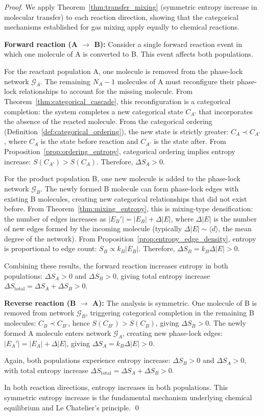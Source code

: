 \documentclass[12pt,a4paper]{article}
\theoremstyle{definition}
\theoremstyle{remark}
\newcommand{\phaselockgraph}{\mathcal{G}}
\begin{document}
\begin{proof}
We apply Theorem~\ref{thm:transfer_mixing} (symmetric entropy increase in molecular transfer) to each reaction direction, showing that the categorical mechanisms established for gas mixing apply equally to chemical reactions.

\textbf{Forward reaction (A $\to$ B):}
Consider a single forward reaction event in which one molecule of A is converted to B. This event affects both populations.

For the reactant population A, one molecule is removed from the phase-lock network $\phaselockgraph_A$. The remaining $N_A - 1$ molecules of A must reconfigure their phase-lock relationships to account for the missing molecule. From Theorem~\ref{thm:categorical_cascade}, this reconfiguration is a categorical completion: the system completes a new categorical state $C_{A'}$ that incorporates the absence of the reacted molecule. From the categorical ordering (Definition~\ref{def:categorical_ordering}), the new state is strictly greater: $C_A \prec C_{A'}$, where $C_A$ is the state before reaction and $C_{A'}$ is the state after. From Proposition~\ref{prop:ordering_entropy}, categorical ordering implies entropy increase: $S(C_{A'}) > S(C_A)$. Therefore, $\Delta S_A > 0$.

For the product population B, one new molecule is added to the phase-lock network $\phaselockgraph_B$. The newly formed B molecule can form phase-lock edges with existing B molecules, creating new categorical relationships that did not exist before. From Theorem~\ref{thm:mixing_entropy}, this is mixing-type densification: the number of edges increases as $|E_B'| = |E_B| + \Delta |E|$, where $\Delta |E|$ is the number of new edges formed by the incoming molecule (typically $\Delta |E| \sim \langle d \rangle$, the mean degree of the network). From Proposition~\ref{prop:entropy_edge_density}, entropy is proportional to edge count: $S_B \propto k_B |E_B|$. Therefore, $\Delta S_B = k_B \Delta |E| > 0$.

Combining these results, the forward reaction increases entropy in both populations: $\Delta S_A > 0$ and $\Delta S_B > 0$, giving total entropy increase $\Delta S_{\text{total}} = \Delta S_A + \Delta S_B > 0$.

\textbf{Reverse reaction (B $\to$ A):}
The analysis is symmetric. One molecule of B is removed from network $\phaselockgraph_B$, triggering categorical completion in the remaining B molecules: $C_B \prec C_{B'}$, hence $S(C_{B'}) > S(C_B)$, giving $\Delta S_B > 0$. The newly formed A molecule enters network $\phaselockgraph_A$, creating new phase-lock edges: $|E_A'| = |E_A| + \Delta |E|$, giving $\Delta S_A = k_B \Delta |E| > 0$.

Again, both populations experience entropy increase: $\Delta S_B > 0$ and $\Delta S_A > 0$, with total entropy increase $\Delta S_{\text{total}} = \Delta S_A + \Delta S_B > 0$.

In both reaction directions, entropy increases in both populations. This symmetric entropy increase is the fundamental mechanism underlying chemical equilibrium and Le Chatelier's principle. \qed
\end{proof}
\end{document}
